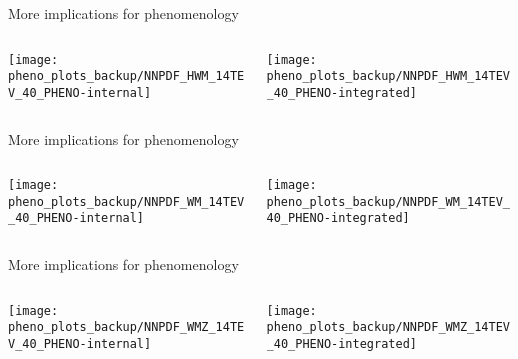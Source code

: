 \begin{frame}[t]{More implications for phenomenology}
    \begin{center}
        \begin{columns}
	        \begin{column}{0.48\textwidth}
	            \begin{center}
	                \texttt{[image: pheno\_plots\_backup/NNPDF\_HWM\_14TEV\_40\_PHENO-internal]} 
	            \end{center}
	        \end{column}
	        \begin{column}{0.48\textwidth}
	            \texttt{[image: pheno\_plots\_backup/NNPDF\_HWM\_14TEV\_40\_PHENO-integrated]}
	        \end{column}
        \end{columns}
    \end{center}
\end{frame}

\begin{frame}[t]{More implications for phenomenology}
    \begin{center}
        \begin{columns}
	        \begin{column}{0.48\textwidth}
	            \begin{center}
	                \texttt{[image: pheno\_plots\_backup/NNPDF\_WM\_14TEV\_40\_PHENO-internal]} 
	            \end{center}
	        \end{column}
	        \begin{column}{0.48\textwidth}
	            \texttt{[image: pheno\_plots\_backup/NNPDF\_WM\_14TEV\_40\_PHENO-integrated]}
	        \end{column}
        \end{columns}
    \end{center}
\end{frame}

\begin{frame}[t]{More implications for phenomenology}
    \begin{center}
        \begin{columns}
	        \begin{column}{0.48\textwidth}
	            \begin{center}
	                \texttt{[image: pheno\_plots\_backup/NNPDF\_WMZ\_14TEV\_40\_PHENO-internal]} 
	            \end{center}
	        \end{column}
	        \begin{column}{0.48\textwidth}
	            \texttt{[image: pheno\_plots\_backup/NNPDF\_WMZ\_14TEV\_40\_PHENO-integrated]}
	        \end{column}
        \end{columns}
    \end{center}
\end{frame}


